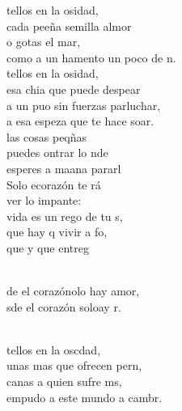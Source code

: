 \documentclass[12pt]{article}
\begin{document}
\begin{multicols*}{2}
\begin{cancion}%
	tellos en la osidad,\\
	cada peeña semilla almor\\
	o gotas  el mar,\\
	como a un hamento un poco de n.\\
	tellos en la osidad,\\
	esa chia que puede despear\\
	a un puo sin fuerzas parluchar,\\
	a esa espeza que te hace soar.\\
	 las cosas peqñas \\
	puedes ontrar lo nde\\
	esperes a maana pararl\\
	Solo ecorazón te rá \\
	ver lo impante: \\
	 vida es un rego de tu s,\\
	que hay q vivir a fo, \\
	que y que entreg   \\\jump\\
	\begin{chorus}%
	de el corazónolo hay amor,\\
	sde el corazón soloay r.\\
	\end{chorus}%
	\jump\\
	tellos en la oscdad,\\
	unas mas que ofrecen pern, \\
	canas a quien sufre ms,\\
	empudo a este mundo a cambr.\\

\end{cancion}
\end{multicols*}
\end{document}
